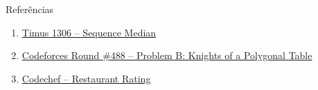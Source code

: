 \begin{frame}[fragile]{Referências}

    \begin{enumerate}
        \item \href{http://acm.timus.ru/problem.aspx?space=1&num=1306}{Timus 1306 -- Sequence Median}

        \item \href{https://codeforces.com/problemset/problem/994/B}{Codeforces Round \#488 -- Problem B: Knights of a Polygonal Table}

        \item \href{https://www.codechef.com/problems/RRATING}{Codechef -- Restaurant Rating}


    \end{enumerate}

\end{frame}
